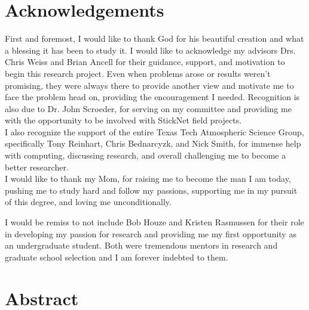 \documentclass{ttuthes2007}
\newcommand{\tab}{\hspace*{2em}}  %
\begin{document}
\chapter{Acknowledgements}

\tab First and foremost, I would like to thank God for his beautiful creation and what a blessing it has been to study it. I would like to acknowledge my advisors Drs. Chris Weiss and Brian Ancell for their guidance, support, and motivation to begin this research project. Even when problems arose or results weren't promising, they were always there to provide another view and motivate me to face the problem head on, providing the encouragement I needed. Recognition is also due to Dr. John Scroeder, for serving on my committee and providing me with the opportunity to be involved with StickNet field projects. \\

\tab I also recognize the support of the entire Texas Tech Atmospheric Science Group, specifically Tony Reinhart, Chris Bednarcyzk, and Nick Smith, for immense help with computing, discussing research, and overall challenging me to become a better researcher. \\

\tab I would like to thank my Mom, for raising me to become the man I am today, pushing me to study hard and follow my passions, supporting me in my pursuit of this degree, and loving me unconditionally. 

\tab I would be remiss to not include Bob Houze and Kristen Rasmussen for their role in developing my passion for research and providing me my first opportunity as an undergraduate student. Both were tremendous mentors in research and graduate school selection and I am forever indebted to them. 


\tableofcontents

\chapter{Abstract}
\end{document}
